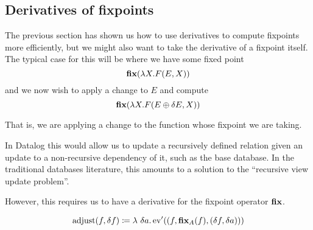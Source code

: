 \subsection{Derivatives of fixpoints}

The previous section has shown us how to use derivatives to compute fixpoints
more efficiently, but we might also want to take the derivative of a fixpoint
itself. The typical case for this will be where we have some fixed point
$$\textbf{fix} (\lambda X . F(E, X))$$
and we now wish to apply a change to $E$ and compute
$$\textbf{fix} (\lambda X . F(E \oplus \delta E, X))$$

That is, we are applying a change to the function whose fixpoint we are taking.

In Datalog this would allow us to update a recursively defined relation given an
update to a non-recursive dependency of it, such as the base database. In the
traditional databases literature, this amounts to a solution to the ``recursive
view update problem''.

However, this requires us to have a derivative for the fixpoint operator $\textbf{fix}$.

\newcommand{\thefixpoint}{\fixpoint_A(f)}
\newcommand{\theadjustment}{\operatorname{adjust}}

\begin{defn}
  $$\theadjustment(f, \change{f}) \defeq \lambda\ \change{a} . \derive{\ev}((f,
  \fixpoint_A(f), (\change{f}, \change{a})))$$
\end{defn}

